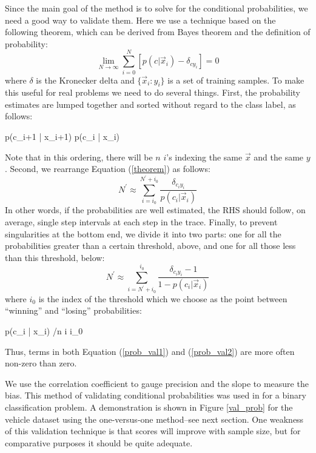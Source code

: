 Since the main goal of the method 
is to solve for the conditional probabilities, 
we need a good way to validate them. 
Here we use a technique based on the
following theorem, which can be derived from Bayes theorem and the 
definition of probability:
\begin{equation}
	\lim_{N \rightarrow \infty} \sum_{i=0}^{N} \left [
	p(c | \vec x_i) - \delta_{cy_i} \right ] = 0
	\label{theorem}
\end{equation}
where 
$\delta$ is the Kronecker delta and
$\lbrace \vec x_i:y_i \rbrace$ is a set of training samples.
To make this useful for real problems we need to do several things.
First, the probability estimates are lumped together and sorted without regard
to the class label, as follows:
\begin{eqnnon}
	p(c_{i+1} | \vec x_{i+1}) \ge p(c_i | \vec x_i)
\end{eqnnon}
Note that in this ordering, there will be $n$ $i$'s indexing the same $\vec x$ 
and the same $y$.
Second, we rearrange Equation (\ref{theorem}) as follows:
\begin{equation}
	N^\prime \approx \sum_{i=i_0}^{N^\prime+i_0} \frac{\delta_{c_i y_i}}{p(c_i | \vec x_i)}
	\label{prob_val1}
\end{equation}
In other words, if the probabilities are well estimated, the RHS should
follow, on average, single step intervals at each step in the trace.
Finally, to prevent singularities at the bottom end, 
we divide it into two parts:
one for all the probabilities greater than a certain threshold, above, 
and one for all those less than this threshold, below:
\begin{equation}
	N^\prime  \approx \sum_{i=N^\prime+i_0}^{i_0} \frac{\delta_{c_i y_i} - 1}{1 - p(c_i | \vec x_i)}
	\label{prob_val2}
\end{equation}
where $i_0$ is the index of the threshold which we choose as the
point between ``winning'' and ``losing'' probabilities:
\begin{eqnnon}
	p(c_i | \vec x_i) /n \iff i \ge i_0
\end{eqnnon}
Thus, terms in both Equation (\ref{prob_val1}) and (\ref{prob_val2}) are more
often non-zero than zero.

We use the correlation coefficient to gauge precision and the slope to
measure the bias.
This method of validating conditional probabilities was used in
\citet{Mills2009} for a binary classification problem.
A demonstration is shown in Figure \ref{val_prob}
for the vehicle dataset using the one-versus-one method--see next section.
One weakness of this validation technique is that scores will improve with 
sample size, but for comparative purposes it should be quite adequate.

